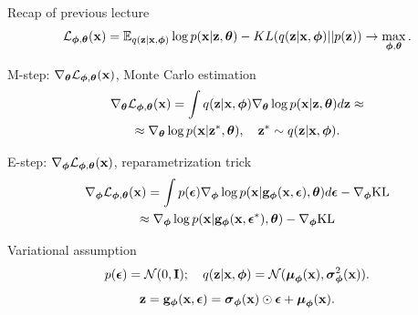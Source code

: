 \begin{frame}{Recap of previous lecture}
	\vspace{-0.3cm}
	\[
		\cL_{\bphi, \btheta}(\bx)  = \mathbb{E}_{q(\bz | \bx, \bphi)} \log p(\bx | \bz , \btheta) - KL(q(\bz| \bx, \bphi) || p(\bz)) \rightarrow \max_{\bphi, \btheta}.
	\]
	\vspace{-0.3cm}
	\begin{block}{M-step: $\nabla_{\btheta}\cL_{\bphi, \btheta}(\bx)$, Monte Carlo estimation}
		\vspace{-0.8cm}
		\begin{multline*}
			\nabla_{\btheta}\cL_{\bphi, \btheta}(\bx)
			= \int q(\bz|\bx, \bphi) \nabla_{\btheta}\log p(\bx|\bz, \btheta) d \bz \approx  \\
			\approx \nabla_{\btheta}\log p(\bx|\bz^*, \btheta), \quad \bz^* \sim q(\bz|\bx, \bphi).
		\end{multline*}
		\vspace{-0.7cm}
	\end{block}
	\begin{block}{E-step: $\nabla_{\bphi}\cL_{\bphi, \btheta}(\bx)$, reparametrization trick}
		\vspace{-0.8cm}
		\begin{multline*}
			\nabla_{\bphi}\cL_{\bphi, \btheta}(\bx) = \int p(\bepsilon) \nabla_{\bphi} \log p(\bx | \bg_{\bphi}(\bx, \bepsilon), \btheta) d\bepsilon  - \nabla_{\bphi} \text{KL}
			\\ \approx \nabla_{\bphi} \log p(\bx | \bg_{\bphi}(\bx, \bepsilon^*), \btheta)  - \nabla_{\bphi} \text{KL}
		\end{multline*}
		\vspace{-0.5cm}
	\end{block}
	\vspace{-0.3cm}
	\begin{block}{Variational assumption}
		\vspace{-0.3cm}
		\[
			p(\bepsilon) = \mathcal{N}(0, \bI); \quad  q(\bz| \bx, \bphi) = \mathcal{N} (\bmu_{\bphi}(\bx), \bsigma^2_{\bphi}(\bx)).
		\]
		\[
			\bz = \bg_{\bphi}(\bx, \bepsilon) = \bsigma_{\bphi}(\bx) \odot \bepsilon + \bmu_{\bphi}(\bx).
		\]
	\end{block}
\end{frame}
